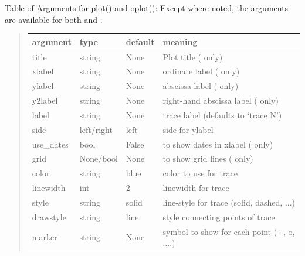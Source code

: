 \documentclass[letterpaper,10pt,english]{sphinxmanual}
\begin{document}
\label{plotpanel:plotopt-table}
Table of Arguments for plot() and oplot():   Except where noted,
the arguments are available for both {\hyperref[plotpanel:plot]{}} and {\hyperref[plotpanel:oplot]{}}.
\begin{quote}

\begin{tabulary}{\linewidth}{|L|L|L|L|}
\hline
\textbf{
argument
} & \textbf{
type
} & \textbf{
default
} & \textbf{
meaning
}\\
\hline

title
 & 
string
 & 
None
 & 
Plot title ({\hyperref[plotpanel:plot]{}} only)
\\

xlabel
 & 
string
 & 
None
 & 
ordinate label ({\hyperref[plotpanel:plot]{}} only)
\\

ylabel
 & 
string
 & 
None
 & 
abscissa label ({\hyperref[plotpanel:plot]{}} only)
\\

y2label
 & 
string
 & 
None
 & 
right-hand abscissa label ({\hyperref[plotpanel:plot]{}} only)
\\

label
 & 
string
 & 
None
 & 
trace label (defaults to `trace N')
\\

side
 & 
left/right
 & 
left
 & 
side for ylabel
\\

use\_dates
 & 
bool
 & 
False
 & 
to show dates in xlabel ({\hyperref[plotpanel:plot]{}} only)
\\

grid
 & 
None/bool
 & 
None
 & 
to show grid lines ({\hyperref[plotpanel:plot]{}} only)
\\

color
 & 
string
 & 
blue
 & 
color to use for trace
\\

linewidth
 & 
int
 & 
2
 & 
linewidth for trace
\\

style
 & 
string
 & 
solid
 & 
line-style for trace (solid, dashed, ...)
\\

drawstyle
 & 
string
 & 
line
 & 
style connecting points of trace
\\

marker
 & 
string
 & 
None
 & 
symbol to show for each point (+, o, ....)
\\


\end{tabulary}
\end{quote}
\end{document}
